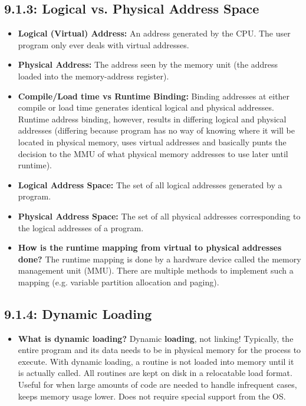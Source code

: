 \documentclass[12pt]{article}
\begin{document}
\subsection*{9.1.3: Logical vs. Physical Address Space}

\begin{itemize}
    \item \textbf{Logical (Virtual) Address:} An address generated by the CPU. The user program only ever deals with virtual addresses.
    \item \textbf{Physical Address:} The address seen by the memory unit (the address loaded into the memory-address register).
    \item \textbf{Compile/Load time vs Runtime Binding:} Binding addresses at either compile or load time generates identical logical and physical addresses. Runtime address binding, however, results in differing logical and physical addresses (differing because program has no way of knowing where it will be located in physical memory, uses virtual addresses and basically punts the decision to the MMU of what physical memory addresses to use later until runtime).
    \item \textbf{Logical Address Space:} The set of all logical addresses generated by a program.
    \item \textbf{Physical Address Space:} The set of all physical addresses corresponding to the logical addresses of a program.
    \item \textbf{How is the runtime mapping from virtual to physical addresses done?} The runtime mapping is done by a hardware device called the memory management unit (MMU). There are multiple methods to implement such a mapping (e.g. variable partition allocation and paging).
\end{itemize}

\subsection*{9.1.4: Dynamic Loading}

\begin{itemize}
    \item \textbf{What is dynamic loading?} Dynamic \textbf{loading}, not linking! Typically, the entire program and its data needs to be in physical memory for the process to execute. With dynamic loading, a routine is not loaded into memory until it is actually called. All routines are kept on disk in a relocatable load format. Useful for when large amounts of code are needed to handle infrequent cases, keeps memory usage lower. Does not require special support from the OS.
\end{itemize}
\end{document}
